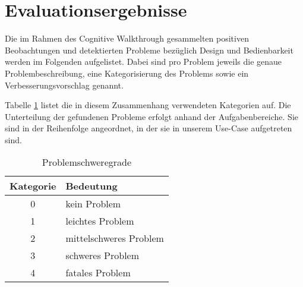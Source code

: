 \section{Evaluationsergebnisse}\label{sec:eval}
Die im Rahmen des Cognitive Walkthrough gesammelten positiven Beobachtungen und detektierten Probleme bezüglich Design und Bedienbarkeit werden im Folgenden aufgelistet. 
Dabei sind pro Problem jeweils die genaue Problembeschreibung, eine Kategorisierung des Problems sowie ein Verbesserungsvorschlag genannt.

Tabelle \ref{tbl:categories} listet die in diesem Zusammenhang verwendeten Kategorien auf. Die Unterteilung der gefundenen Probleme erfolgt anhand der Aufgabenbereiche. Sie sind in der Reihenfolge angeordnet, in der sie in unserem Use-Case aufgetreten sind.

\begin{table}[h]
	\centering\begin{tabular}{|c|l|}
		\hline
		\textbf{Kategorie} & \textbf{Bedeutung} \\
		\hline
		0 & kein Problem \\
		1 & leichtes Problem \\
		2 & mittelschweres Problem \\
		3 & schweres Problem \\
		4 & fatales Problem \\
		\hline
	\end{tabular}
	\caption{Problemschweregrade\label{tbl:categories}}
\end{table}